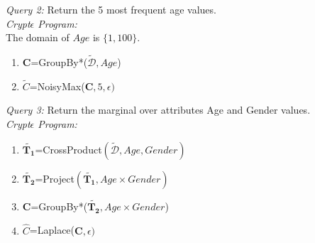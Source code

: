 \begin{exmp}\textit{Query 2:} Return the 5 most frequent age values.\\\textit{Crypt$\epsilon$ Program:}\\ The domain of $Age$ is $\{1,100\}$.\begin{enumerate} \item $\mathbf{C}$=GroupBy*($\boldsymbol{\tilde{\mathcal{D}}},Age$)   \item $\tilde{C}$=NoisyMax($\mathbf{C},5,\epsilon)$\end{enumerate}\end{exmp}
\begin{exmp}\textit{Query 3:} Return the marginal over attributes Age and Gender values.\\\textit{Crypt$\epsilon$ Program:} \begin{enumerate} \item $\tilde{\mathbf{T_1}}$=CrossProduct$(\boldsymbol{\tilde{\mathcal{D}}},Age,Gender)$ \item $\tilde{\mathbf{T_2}}$=Project$(\tilde{\mathbf{T_1}}, Age \times Gender)$\item  $\mathbf{C}$=GroupBy*($\tilde{\mathbf{T_2}},Age \times Gender $)   \item $\hat{C}$=Laplace($\mathbf{C},\epsilon)$\end{enumerate}\end{exmp}

